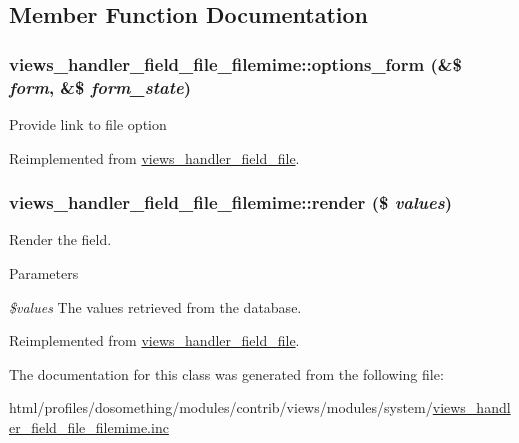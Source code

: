 \subsection{Member Function Documentation}
\hypertarget{classviews__handler__field__file__filemime_a0ca50231798333edb2dbe1a53d560b8f}{
\subsubsection[{options\_\-form}]{\setlength{\rightskip}{0pt plus 5cm}views\_\-handler\_\-field\_\-file\_\-filemime::options\_\-form (\&\$ {\em form}, \/  \&\$ {\em form\_\-state})}}
\label{classviews__handler__field__file__filemime_a0ca50231798333edb2dbe1a53d560b8f}
Provide link to file option 

Reimplemented from \hyperlink{classviews__handler__field__file_aab95242357e45be9c4fbbced1f625d7b}{views\_\-handler\_\-field\_\-file}.\hypertarget{classviews__handler__field__file__filemime_aab7e80e82c714c09997290dc1b58088e}{
\subsubsection[{render}]{\setlength{\rightskip}{0pt plus 5cm}views\_\-handler\_\-field\_\-file\_\-filemime::render (\$ {\em values})}}
\label{classviews__handler__field__file__filemime_aab7e80e82c714c09997290dc1b58088e}
Render the field.


\begin{DoxyParams}{Parameters}
\item[{\em \$values}]The values retrieved from the database. \end{DoxyParams}


Reimplemented from \hyperlink{classviews__handler__field__file_a624c3ed9f9f4b194e2a9a0b7d6acb384}{views\_\-handler\_\-field\_\-file}.

The documentation for this class was generated from the following file:\begin{DoxyCompactItemize}
\item 
html/profiles/dosomething/modules/contrib/views/modules/system/\hyperlink{views__handler__field__file__filemime_8inc}{views\_\-handler\_\-field\_\-file\_\-filemime.inc}\end{DoxyCompactItemize}
